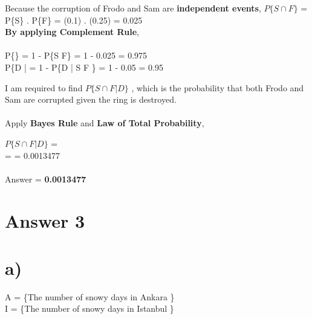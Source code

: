 \documentclass[11pt]{article}
\begin{document}
\noindent Because the corruption of Frodo and Sam are \textbf{independent events}, 
$P\{S \cap F \}$ = P\{S\} . P\{F\} = (0.1) . (0.25) = 0.025 \\ 

\noindent \textbf{By applying Complement Rule}, \\ \\
P\{\} = 1 - P\{S \cap F\} = 1 - 0.025 = 0.975 \\
P\{D |  = 1 - P\{D | S \cap F \} = 1 - 0.05 = 0.95
\newpage

\noindent I am required to find $P\{S \cap F | D\}$ , which is the probability that both Frodo and Sam are corrupted given the ring is destroyed. \\ \\
\noindent Apply \textbf{Bayes Rule} and \textbf{Law of Total Probability}, \newline \newline

\noindent $P\{S \cap F | D\}$ = 
 \\ =  \newline \newline  = 0.0013477 \\ \\

\noindent Answer = \textbf{0.0013477}



\newpage















\section*{Answer 3}
\section*{a)}
A = \{The number of snowy days in Ankara \} \\
I = \{The number of snowy days in Istanbul \} \\
\end{document}
